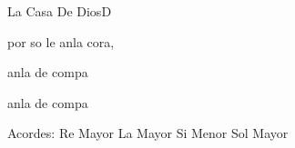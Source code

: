 \documentclass[12pt, spanish]{book}
\begin{document}
\begin{song}{La Casa De Dios}{D}
\begin{SBOpGroup}
            por so le anla  cora,

            anla de  compa

            anla de  compa
        \end{SBOpGroup}

        \ifChordBk
        \begin{SBOpGroup}
            Acordes:
            \upchord{\D}\qquad Re Mayor \hfill
            \upchord{\A}\qquad La Mayor \hfill\null\break
            \upchord{\Bm}\qquad Si Menor \hfill
            \upchord{\G}\qquad Sol Mayor \hfill\null\break
        \end{SBOpGroup}
        \fi
    \end{song}
\end{document}
